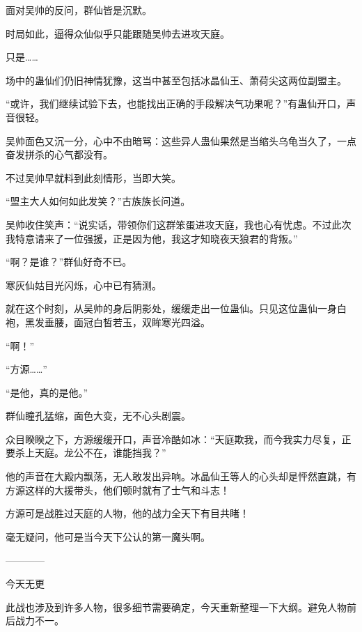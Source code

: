 \begin{this_body}
面对吴帅的反问，群仙皆是沉默。

时局如此，逼得众仙似乎只能跟随吴帅去进攻天庭。

只是……

场中的蛊仙们仍旧神情犹豫，这当中甚至包括冰晶仙王、萧荷尖这两位副盟主。

“或许，我们继续试验下去，也能找出正确的手段解决气功果呢？”有蛊仙开口，声音很轻。

吴帅面色又沉一分，心中不由暗骂：这些异人蛊仙果然是当缩头乌龟当久了，一点奋发拼杀的心气都没有。

不过吴帅早就料到此刻情形，当即大笑。

“盟主大人如何如此发笑？”古族族长问道。

吴帅收住笑声：“说实话，带领你们这群笨蛋进攻天庭，我也心有忧虑。不过此次我特意请来了一位强援，正是因为他，我这才知晓夜天狼君的背叛。”

“啊？是谁？”群仙好奇不已。

寒灰仙姑目光闪烁，心中已有猜测。

就在这个时刻，从吴帅的身后阴影处，缓缓走出一位蛊仙。只见这位蛊仙一身白袍，黑发垂腰，面冠白皙若玉，双眸寒光四溢。

“啊！”

“方源……”

“是他，真的是他。”

群仙瞳孔猛缩，面色大变，无不心头剧震。

众目睽睽之下，方源缓缓开口，声音冷酷如冰：“天庭欺我，而今我实力尽复，正要杀上天庭。龙公不在，谁能挡我？”

他的声音在大殿内飘荡，无人敢发出异响。冰晶仙王等人的心头却是怦然直跳，有方源这样的大援带头，他们顿时就有了士气和斗志！

方源可是战胜过天庭的人物，他的战力全天下有目共睹！

毫无疑问，他可是当今天下公认的第一魔头啊。

------------

今天无更

此战也涉及到许多人物，很多细节需要确定，今天重新整理一下大纲。避免人物前后战力不一。

\end{this_body}

